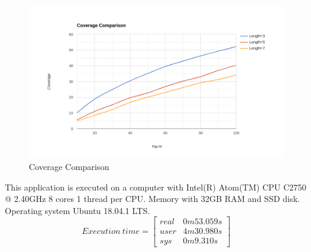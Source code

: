 \begin{figure}[h!]
   \centering
   \includegraphics[width=1\linewidth]{images/coverage-comparison.png}
   \caption{Coverage Comparison}
   \label{fig:coverage-comparison}
\end{figure}

This application is executed on a computer with Intel(R) Atom(TM) CPU  C2750  @ 2.40GHz 8 cores 1 thread per CPU. Memory with 32GB RAM and SSD disk. Operating system Ubuntu 18.04.1 LTS.
\[
Execution\ time=
  \begin{bmatrix}
    real & 0m53.059s \\
    user & 4m30.980s \\
    sys & 0m9.310s
  \end{bmatrix}
\]